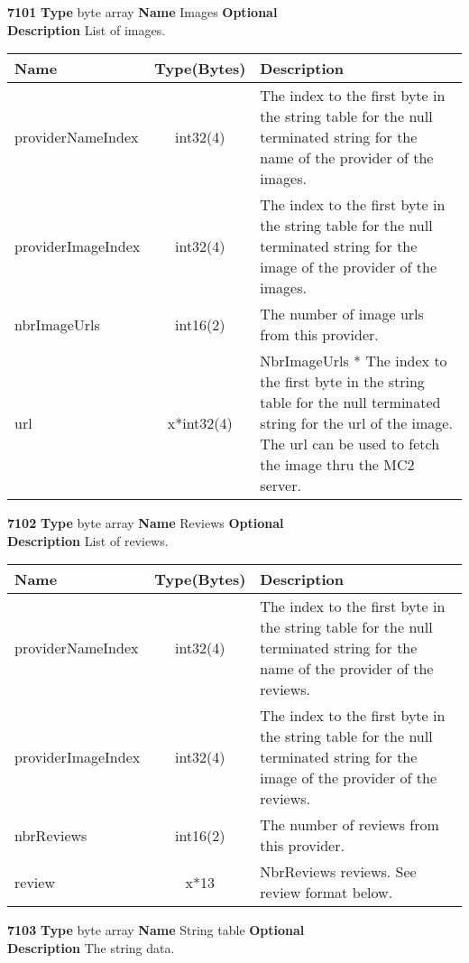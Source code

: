 \documentclass[a4paper]{article}
\begin{document}
\begin{list}{\textbf{ParamID}}{}
\item \textbf{7101} \textbf{Type} byte array \textbf{Name} Images
                  \textbf{Optional} \\
  \textbf{Description} List of images.\\
  \begin{tabular}{|l|c|p{7cm}|}
    \hline
  \textbf{Name} & \textbf{Type(Bytes)} & \textbf{Description} \\\hline
    providerNameIndex & int32(4)  & The index to the first byte in the string table for 
the null terminated string for the name of the provider of the images.      \\\hline
    providerImageIndex & int32(4)  & The index to the first byte in the string table for 
the null terminated string for the image of the provider of the images.      \\\hline
    nbrImageUrls& int16(2)       & The number of image urls from this provider.\\\hline
    url      & x*int32(4)  & NbrImageUrls * The index to the first byte in the string table for 
the null terminated string for the url of the image. The url can be used to fetch the image 
thru the MC2 server.                  \\\hline
  \end{tabular}

\item \textbf{7102} \textbf{Type} byte array \textbf{Name} Reviews
                  \textbf{Optional} \\
  \textbf{Description} List of reviews.\\
  \begin{tabular}{|l|c|p{7cm}|}
    \hline
  \textbf{Name} & \textbf{Type(Bytes)} & \textbf{Description} \\\hline
    providerNameIndex & int32(4)  & The index to the first byte in the string table for 
the null terminated string for the name of the provider of the reviews.      \\\hline
    providerImageIndex & int32(4)  & The index to the first byte in the string table for 
the null terminated string for the image of the provider of the reviews.      \\\hline
    nbrReviews& int16(2)       & The number of reviews from this provider.\\\hline
    review    & x*13  & NbrReviews reviews. See review format below.   \\\hline
  \end{tabular}

\item \textbf{7103} \textbf{Type} byte array \textbf{Name} String table
                  \textbf{Optional} \\
  \textbf{Description} The string data.

\end{list}
\end{document}
